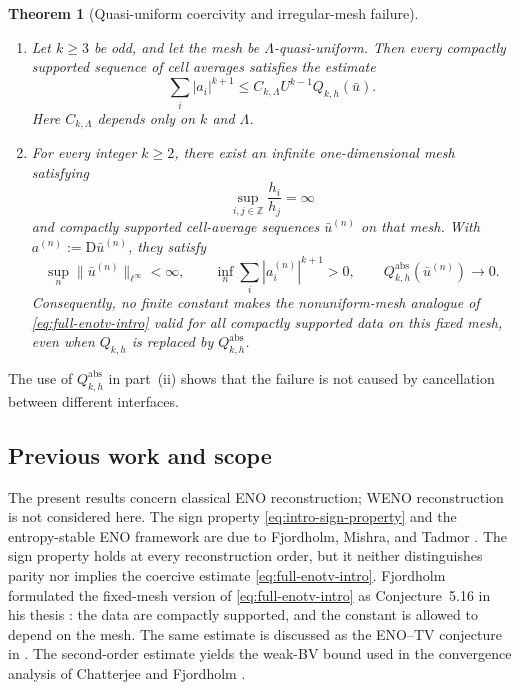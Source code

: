 \documentclass[11pt]{amsart}
\theoremstyle{plain}
\theoremstyle{definition}
\theoremstyle{remark}
\numberwithin{equation}{section}
\theoremstyle{plain}
\newtheorem{lettertheorem}{Theorem}
\begin{document}
\begin{lettertheorem}[Quasi-uniform coercivity and irregular-mesh
failure]\label{thm:D}
	\leavevmode
	\begin{enumerate}[label=\textup{(\roman*)},leftmargin=2.2em]
		\item Let $k\ge3$ be odd, and let the mesh be $\Lambda$-quasi-uniform.
		Then every compactly supported sequence of cell averages satisfies the estimate
		\begin{equation}\label{eq:intro-quasi-uniform-main}
			\sum_i|a_i|^{k+1}
			\le C_{k,\Lambda}U^{k-1}Q_{k,h}(\bar u).
		\end{equation}
		Here $C_{k,\Lambda}$ depends only on $k$ and $\Lambda$.

		\item For every integer $k\ge2$, there exist an infinite
		one-dimensional mesh satisfying
		\[
			\sup_{i,j\in\mathbb Z}\frac{h_i}{h_j}=\infty
		\]
		and compactly supported cell-average sequences $\bar u^{(n)}$ on that
		mesh.  With $a^{(n)}:=\mathrm D\bar u^{(n)}$, they satisfy
		\[
			\sup_n\|\bar u^{(n)}\|_{\ell^\infty}<\infty,
			\qquad
			\inf_n\sum_i|a_i^{(n)}|^{k+1}>0,
			\qquad
			Q_{k,h}^{\mathrm{abs}}(\bar u^{(n)})\longrightarrow0.
		\]
		Consequently, no finite constant makes the nonuniform-mesh analogue of
		\eqref{eq:full-enotv-intro} valid for all compactly supported data on this
		fixed mesh, even when $Q_{k,h}$ is
		replaced by $Q_{k,h}^{\mathrm{abs}}$.
	\end{enumerate}
\end{lettertheorem}

The use of $Q_{k,h}^{\mathrm{abs}}$ in part~\textup{(ii)} shows that the
failure is not caused by cancellation between different interfaces.

\subsection{Previous work and scope}\label{sec:intro-previous-work}

The present results concern classical ENO reconstruction; WENO reconstruction
is not considered here.  The sign property \eqref{eq:intro-sign-property} and
the entropy-stable ENO framework are due to Fjordholm, Mishra, and Tadmor
\cite{FMT,FMTtecno}.  The sign property holds at every reconstruction order,
but it neither distinguishes parity nor implies the coercive estimate
\eqref{eq:full-enotv-intro}.  Fjordholm formulated the fixed-mesh version of
\eqref{eq:full-enotv-intro} as Conjecture~5.16 in his thesis
\cite{FjordholmThesis}: the data are compactly supported, and the constant is
allowed to depend on the mesh.  The same estimate is discussed as the ENO--TV
conjecture in \cite{FjordholmHandbook}.  The second-order estimate yields the
weak-BV bound used in the convergence analysis of Chatterjee and Fjordholm
\cite{CFM2AN}.
\end{document}
